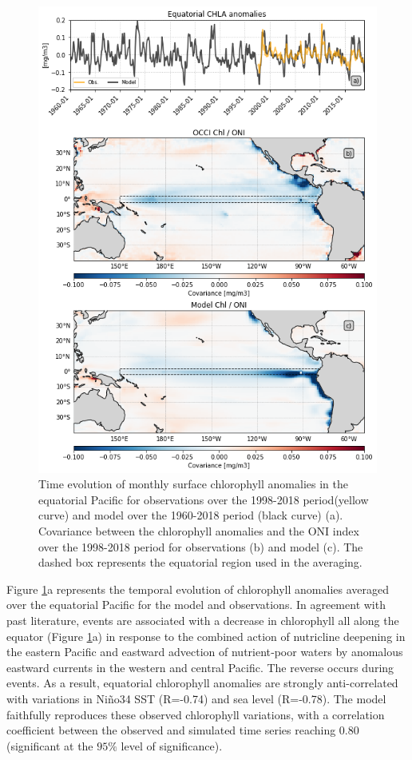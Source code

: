 \begin{figure}[h!tp]
	\centering
	\includegraphics[scale=0.4]{figs/fig2.png}
	\caption{Time evolution of monthly surface chlorophyll anomalies in the equatorial Pacific for observations over the  1998-2018 period(yellow curve) and  model over the  1960-2018 period (black curve) (a). Covariance between the chlorophyll anomalies and the ONI index over the 1998-2018 period for observations (b) and model (c). The dashed box represents the equatorial region used in the averaging.}
	\label{fig:nemo-sat-chl}
\end{figure}

Figure \ref{fig:nemo-sat-chl}a represents the temporal evolution of chlorophyll anomalies averaged over the equatorial Pacific for the model and observations. In agreement with past literature, \nino{} events are associated with a decrease in chlorophyll all along the equator (Figure \ref{fig:nemo-sat-chl}a) in response to the combined action of nutricline deepening in the eastern Pacific and eastward advection of nutrient‐poor waters by anomalous eastward currents in the western and central Pacific. The reverse occurs during \nina{} events. As a result, equatorial chlorophyll anomalies are strongly anti-correlated with variations in Niño34 SST (R=-0.74) and sea level (R=-0.78). The model faithfully reproduces these observed chlorophyll variations, with a correlation coefficient between the observed and simulated time series reaching $0.80$ (significant at the $95\%$ level of significance).

